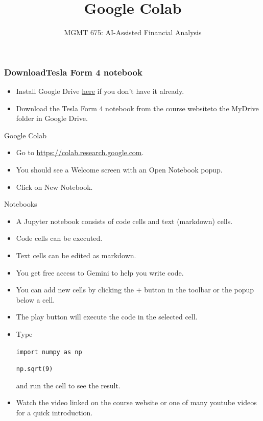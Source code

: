 \documentclass[10pt]{beamer}
\title{Google Colab}
\subtitle{MGMT 675: AI-Assisted Financial Analysis}
\date{}
\begin{document}
\begin{frame}[plain]
\titlepage
\end{frame}

\begin{frame}
    \frametitle{DownloadTesla Form 4 notebook}
    \begin{itemize}
        \item Install Google Drive \href{https://support.google.com/a/users/answer/13022292?hl=en}{here} if you don't have it already.      
        \item Download the Tesla Form 4 notebook from the course websiteto the MyDrive folder in Google Drive.
    \end{itemize}
\end{frame}

\begin{frame}{Google Colab}
    \begin{itemize}
        \item Go to \href{https://colab.research.google.com}{https://colab.research.google.com}.
        \item You should see a Welcome screen with an Open Notebook popup.
        \item Click on New Notebook.
  \end{itemize}
\end{frame}

\begin{frame}{Notebooks}
    \begin{itemize}
        \item A Jupyter notebook consists of code cells and text (markdown) cells.
        \item Code cells can be executed.
        \item Text cells can be edited as markdown.
        \item You get free access to Gemini to help you write code.
        \item You can add new cells by clicking the + button in the toolbar or the popup below a cell.
        \item The play button will execute the code in the selected cell.
        \item Type 
        
        \texttt{import numpy as np}

        \texttt{np.sqrt(9)}

        and run the cell to see the result.
        \item Watch the video linked on the course website or one of many youtube videos for a quick introduction.
        
    \end{itemize}
\end{frame}
\end{document}
